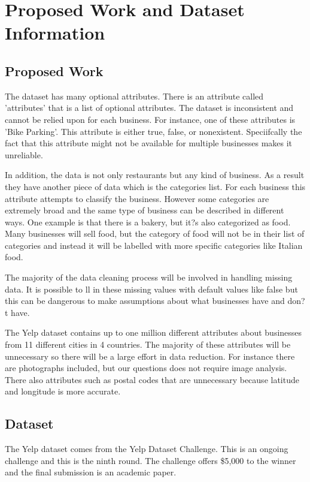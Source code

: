 \section{Proposed Work and Dataset Information}

\subsection{Proposed Work}

The dataset has many optional attributes. There is an attribute called 'attributes' that is a list of optional attributes. The dataset is inconsistent and cannot be relied upon for each business. For instance, one of these attributes is 'Bike Parking'. This attribute is either true, false, or nonexistent. Speciifcally the fact that this attribute might not be available for multiple businesses makes it unreliable.

\quad In addition, the data is not only restaurants but any kind of business. As a result they have another piece of data which is the categories list. For each business this attribute attempts to classify the business. However some categories are extremely broad and the same type of business can be described in different ways. One example is that there is a bakery, but it?s also categorized as food. Many businesses will sell food, but the category of food will not be in their list of categories and instead it will be labelled with more specific categories like Italian food.

\quad The majority of the data cleaning process will be involved in handling missing data. It is possible to  ll in these missing values with default values like false but this can be dangerous to make assumptions about what businesses have and don?t have.

\quad The Yelp dataset contains up to one million different attributes about businesses from 11 different cities in 4 countries. The majority of these attributes will be unnecessary so there will be a large effort in data reduction. For instance there are photographs included, but our questions does not require image analysis. There also attributes such as postal codes that are unnecessary because latitude and longitude is more accurate.

\subsection{Dataset}

The Yelp dataset comes from the Yelp Dataset Challenge. This is an ongoing challenge and this is the ninth round. The challenge offers \$5,000 to the winner and the  final submission is an academic paper.

